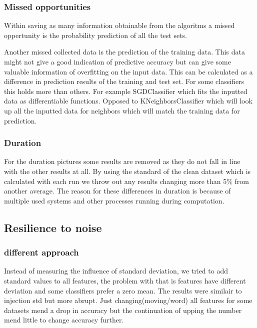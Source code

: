 \documentclass[a4paper,10pt]{article}
\begin{document}
\subsubsection{Missed opportunities}
Within saving as many information obtainable from the algoritms a missed oppertunity is the probability prediction of all the test sets. 

Another missed collected data is the prediction of the training data. This data might not give a good indication of predictive accuracy but can give some valuable information of overfitting on the input data. This can be calculated as a difference in prediction results of the training and test set. For some classifiers this holds more than others. For example SGDClassifier which fits the inputted data as differentiable functions. Opposed to KNeighborsClassifier which will look up all the inputted data for neighbors which will match the training data for prediction. 

\subsubsection{Duration}
For the duration pictures some results are removed as they do not fall in line with the other results at all. By using the standard of the clean dataset which is calculated with each run we throw out any results changing more than 5$\%$ from another average.
The reason for these differences in duration is because of multiple used systems and other processes running during computation. 

\subsection{Resilience to noise}






\subsubsection{different approach}
Instead of measuring the influence of standard deviation, we tried to add standard values to all features, the problem with that is features have different deviation and some classifiers prefer a zero mean. The results were similair to injection std but more abrupt. Just changing(moving/word) all features for some datasets mend a drop in accuracy but the continuation of upping the number mend little to change accuracy further.
\end{document}

